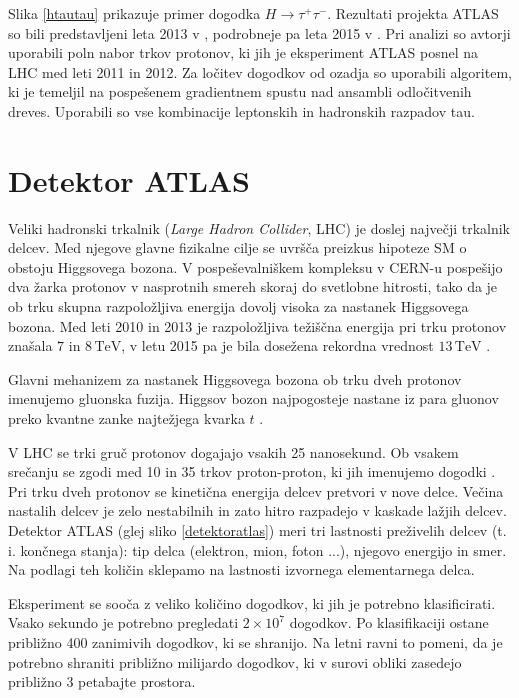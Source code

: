 \documentclass[11pt,a4paper,openany]{book}
\begin{document}
Slika \ref{htautau} prikazuje primer dogodka $H \rightarrow \tau^+\tau^-$. Rezultati projekta ATLAS so bili predstavljeni leta 2013 v \cite{atlas2013}, podrobneje pa leta 2015 v \cite{atlas2015htautau}. Pri analizi so avtorji uporabili poln nabor trkov protonov, ki jih je eksperiment ATLAS posnel na LHC med leti 2011 in 2012. Za ločitev dogodkov od ozadja so uporabili algoritem, ki je temeljil na pospešenem gradientnem spustu nad ansambli odločitvenih dreves. Uporabili so vse kombinacije leptonskih in hadronskih razpadov tau.

\section{Detektor ATLAS}
\label{sec:atlasdetector}
Veliki hadronski trkalnik (\textit{Large Hadron Collider}, {LHC}) je doslej največji trkalnik delcev. Med njegove glavne fizikalne cilje se uvršča preizkus hipoteze SM o obstoju Higgsovega bozona. V pospeševalniškem kompleksu v CERN-u pospešijo dva žarka protonov v nasprotnih smereh skoraj do svetlobne hitrosti, tako da je ob trku skupna razpoložljiva energija dovolj visoka za nastanek Higgsovega bozona. Med leti 2010 in 2013 je razpoložljiva težiščna energija pri trku protonov znašala $7$ in $8\,\text{TeV}$, v letu 2015 pa je bila dosežena rekordna vrednost $13\,\text{TeV}$ \cite{WikiLHC}.

Glavni mehanizem za nastanek Higgsovega bozona ob trku dveh protonov imenujemo gluonska fuzija. Higgsov bozon najpogosteje nastane iz para gluonov preko kvantne zanke najtežjega kvarka $t$ \cite{AadScience2012}. 

V LHC se trki gruč protonov dogajajo vsakih 25 nanosekund. Ob vsakem srečanju se zgodi med 10 in 35 trkov proton-proton, ki jih imenujemo dogodki \cite{ChallengeDoc}. Pri trku dveh protonov se kinetična energija delcev pretvori v nove delce. Večina nastalih delcev je zelo nestabilnih in zato hitro razpadejo v kaskade lažjih delcev. Detektor ATLAS (glej sliko \ref{detektoratlas}) meri tri lastnosti preživelih delcev (t. i. končnega stanja): tip delca (elektron, mion, foton ...), njegovo energijo in smer. Na podlagi teh količin sklepamo na lastnosti izvornega elementarnega delca.

Eksperiment se sooča z veliko količino dogodkov, ki jih je potrebno klasificirati. Vsako sekundo je potrebno pregledati $2 \times 10^7$ dogodkov. Po klasifikaciji ostane približno 400 zanimivih dogodkov, ki se shranijo. Na letni ravni to pomeni, da je potrebno shraniti približno milijardo dogodkov, ki v surovi obliki zasedejo približno 3 petabajte prostora.
\end{document}
